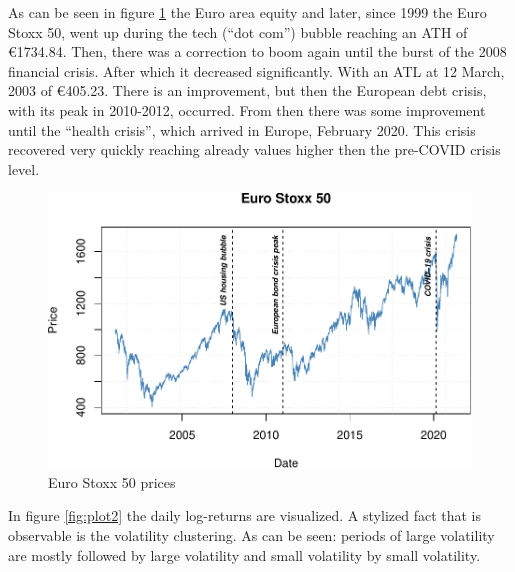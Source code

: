 \documentclass[a4paper, nobind]{templates/ociamthesis}
\begin{document}
\clearpage

\noindent As can be seen in figure \ref{fig:plot1} the Euro area equity and later, since 1999 the Euro Stoxx 50, went up during the tech (``dot com'') bubble reaching an ATH of €1734.84. Then, there was a correction to boom again until the burst of the 2008 financial crisis. After which it decreased significantly. With an ATL at 12 March, 2003 of €405.23. There is an improvement, but then the European debt crisis, with its peak in 2010-2012, occurred. From then there was some improvement until the ``health crisis'', which arrived in Europe, February 2020. This crisis recovered very quickly reaching already values higher then the pre-COVID crisis level.

\begin{figure}[!ht]

{\centering \includegraphics[width=0.95\linewidth]{_main_files/figure-latex/plot1-1} 

}

\caption{Euro Stoxx 50 prices}\label{fig:plot1}
\end{figure}

\clearpage

\noindent In figure \ref{fig:plot2} the daily log-returns are visualized. A stylized fact that is observable is the volatility clustering. As can be seen: periods of large volatility are mostly followed by large volatility and small volatility by small volatility.
\end{document}
